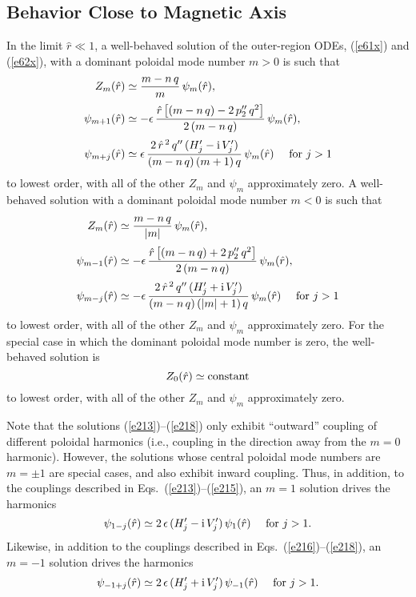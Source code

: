 \documentclass[12pt,prb,aps]{revtex4-1}
\begin{document}
\subsection{Behavior Close to Magnetic Axis}\label{axis}
In the limit $\hat{r}\ll 1$,  a well-behaved solution of the outer-region ODEs, (\ref{e61x}) and (\ref{e62x}), with a dominant poloidal
mode number $m>0$ is such that\,\cite{am1}
\begin{align}\label{e213}
Z_m(\hat{r})&\simeq \frac{m-n\,q}{m}\,\psi_m(\hat{r}),\\[0.5ex]
\psi_{m+1}(\hat{r})&\simeq- \epsilon\,\frac{\hat{r}\left[(m-n\,q)-2\,p_2''\,q^2\right]}{2\,(m-n\,q)}\,\psi_m(\hat{r}),\\[0.5ex]
\psi_{m+j} (\hat{r})&\simeq 
\epsilon\,\frac{2\,\hat{r}^{\,2}\,q''\,(H_j'-{\rm i}\,V_j')}{(m-n\,q)\,(m+1)\,q}\,\psi_m(\hat{r})\mbox{~~~~for $j>1$}\label{e215}
\end{align}
to lowest order, with all of the other $Z_m$ and $\psi_m$ approximately zero. 
A well-behaved solution with a dominant poloidal mode number $m<0$ is such that 
\begin{align}
Z_m(\hat{r})&\simeq \frac{m-n\,q}{|m|}\,\psi_m(\hat{r}),\label{e216}\\[0.5ex]
\psi_{m-1}(\hat{r})&\simeq -\epsilon\,\frac{\hat{r}\left[(m-n\,q)+2\,p_2''\,q^2\right]}{2\,(m-n\,q)}\,\psi_m(\hat{r}),\\[0.5ex]
\psi_{m-j} (\hat{r})&\simeq 
-\epsilon\,\frac{2\,\hat{r}^{\,2}\,q''\,(H_j'+{\rm i}\,V_j')}{(m-n\,q)\,(|m|+1)\,q}\,\psi_m(\hat{r})\mbox{~~~~for $j>1$}\label{e218}
\end{align}
to lowest order, with all of the other $Z_m$ and $\psi_m$ approximately zero. For the special case in which the dominant poloidal
mode number is zero, the well-behaved solution is
\begin{equation}
Z_0(\hat{r})\simeq {\rm constant}
\end{equation}
to lowest order, with all of the other $Z_m$ and $\psi_m$ approximately zero. 

Note that the solutions (\ref{e213})--(\ref{e218}) only exhibit ``outward'' coupling of different poloidal harmonics
(i.e., coupling in the direction away from the $m=0$ harmonic). However, the solutions whose central poloidal
mode numbers are $m=\pm 1$ are special cases, and also exhibit inward coupling. Thus, in addition, to the
couplings described in Eqs.~(\ref{e213})--(\ref{e215}), an $m=1$ solution drives the harmonics
\begin{equation}
\psi_{1-j}(\hat{r})\simeq 2\,\epsilon\,(H_j'-{\rm i}\,V_j')\,\psi_1(\hat{r})\mbox{~~~~for $j>1$}.
\end{equation}
Likewise, in addition to the couplings described in Eqs.~(\ref{e216})--(\ref{e218}), an $m=-1$ solution drives the
harmonics
\begin{equation}
\psi_{-1+j}(\hat{r})\simeq 2\,\epsilon\,(H_j'+{\rm i}\,V_j')\,\psi_{-1}(\hat{r})\mbox{~~~~for $j>1$}.
\end{equation}
\end{document}

